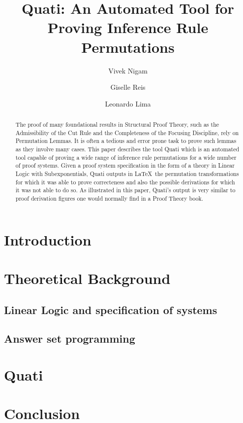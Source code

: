 \documentclass{llncs}
\title{Quati: An Automated Tool for Proving Inference Rule Permutations}
\author{Vivek Nigam\inst{1} \and Giselle Reis\inst{2} \and Leonardo Lima\inst{1}}
\institute{Universidade Federal da Para\'{i}ba, Brazil
\and Technische Universit\"{a}t Wien, Austria
}
\begin{document}
\maketitle

\begin{abstract}
The proof of many foundational results in Structural Proof Theory, such as the Admissibility of the Cut Rule and 
the Completeness of the Focusing Discipline, rely on Permutation Lemmas. It is often a tedious and error prone  
task to prove such lemmas as they involve many cases. This paper describes the tool Quati which is an automated tool capable of proving
a wide range of inference rule permutations for a wide number of proof systems. Given a proof system specification 
in the form of a theory in Linear Logic with Subexponentials, Quati
outputs in \LaTeX\ the permutation transformations for which it was able to prove correcteness and also the 
possible derivations for which it was not able to do so. As illustrated in this paper, Quati's output is very similar to 
proof derivation figures one would normally find in a Proof Theory book. 

\end{abstract}

\section{Introduction}

\section{Theoretical Background}


\subsection{Linear Logic and specification of systems}

\subsection{Answer set programming}

\section{Quati}


\section{Conclusion}
\end{document}
